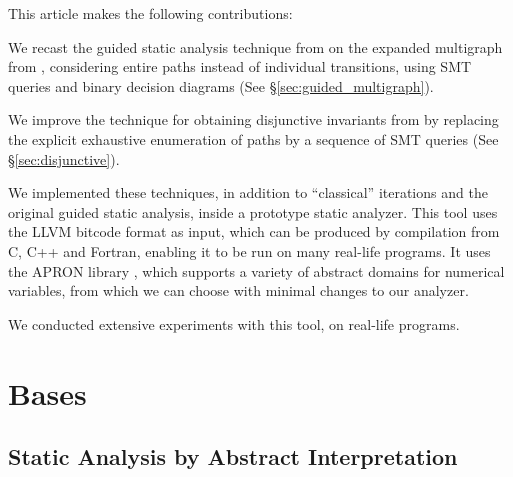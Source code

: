 This article makes the following contributions:
\begin{compactenum}
\item We recast the guided static analysis technique from \cite{DBLP:conf/sas/GopanR07} on the expanded multigraph from \cite{Monniaux_Gonnord_SAS11}, considering entire paths instead of individual transitions, using SMT queries and binary decision diagrams\label{contr:guided_multigraph} (See \S\ref{sec:guided_multigraph}).
\item We improve the technique for obtaining disjunctive invariants from \cite{DBLP:conf/pldi/GulwaniZ10} by replacing the explicit exhaustive enumeration of paths by a sequence of SMT queries\label{contr:disjunctive} (See \S\ref{sec:disjunctive}).
\item We implemented these techniques, in addition to ``classical'' iterations and the original guided static analysis, inside a prototype static analyzer.
This tool uses the LLVM bitcode format \cite{Lattner:2004:LCF:977395.977673,LLVM_langref} as input, which can be produced by compilation from C, C++ and Fortran, enabling it to be run on many real-life programs.
It uses the APRON library \cite{DBLP:conf/cav/JeannetM09}, which
supports a variety of abstract domains for numerical variables, from
which we can choose with minimal changes to our analyzer.


\item We conducted extensive experiments with this tool, on real-life programs.
\end{compactenum}

\section{Bases}
\subsection{Static Analysis by Abstract Interpretation}
\label{sec:static_analysis}

